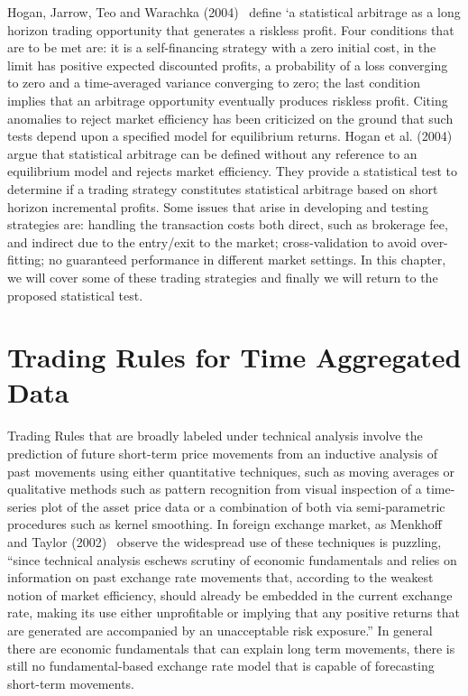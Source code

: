 Hogan, Jarrow, Teo and Warachka (2004)~\cite{Hogan} define `a statistical arbitrage as a long horizon trading opportunity that generates a riskless profit. Four conditions that are to be met are: it is a self-financing strategy with a zero initial cost, in the limit has positive expected discounted profits, a probability of a loss converging to zero and a time-averaged variance converging to zero; the last condition implies that an arbitrage opportunity eventually produces riskless profit. Citing anomalies to reject  market efficiency has been criticized on the ground that such tests depend upon a specified model for equilibrium returns. Hogan et al. (2004)~\cite{Hogan} argue that statistical arbitrage can be defined without any reference to an equilibrium model and rejects market efficiency. They provide a statistical test to determine if a trading strategy constitutes statistical arbitrage based on short horizon incremental profits. Some issues that arise in developing and testing strategies are: handling the transaction costs both direct, such as brokerage fee, and indirect due to the entry/exit to the market; cross-validation to avoid over-fitting; no guaranteed performance in different market settings. In this chapter, we will cover some of these trading strategies and finally we will return to the proposed statistical test.



\section{Trading Rules for Time Aggregated Data \label{s:trading_rules_tad}}


Trading Rules that are broadly labeled under technical analysis involve the prediction of future short-term price movements from an inductive analysis of past movements using either quantitative techniques, such as moving averages or qualitative methods such as pattern recognition from visual inspection of a time-series plot of the asset price data or a combination of both via semi-parametric procedures such as kernel smoothing. In foreign exchange market, as Menkhoff and Taylor (2002)~\cite{MalTay} observe the widespread use of these techniques is puzzling, ``since technical analysis eschews scrutiny of economic fundamentals and relies on information on past exchange rate movements that, according to the weakest notion of market efficiency, should already be embedded in the current exchange rate, making its use either unprofitable or implying that any positive returns that are generated are accompanied by an unacceptable risk exposure.'' In general there are economic fundamentals that can explain long term movements, there is still no fundamental-based exchange rate model that is capable of forecasting short-term movements.


